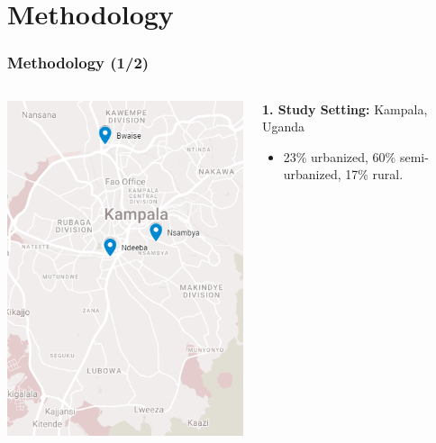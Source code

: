 
\section{Methodology}
\begin{frame}[shrink=30]
    \frametitle{Methodology (1/2)}
    \begin{columns}
        \begin{column}{0.4\textwidth}
            \centering
            \includegraphics[width=\textwidth]{../../Common/figures/studyArea.png} %
        \end{column}
        \begin{column}{0.6\textwidth}
            \textbf{1. Study Setting:} Kampala, Uganda
            \begin{itemize}
                \item 23\% urbanized, 60\% semi-urbanized, 17\% rural.
            \end{itemize}
            

\end{column}
\end{columns}
\end{frame}

